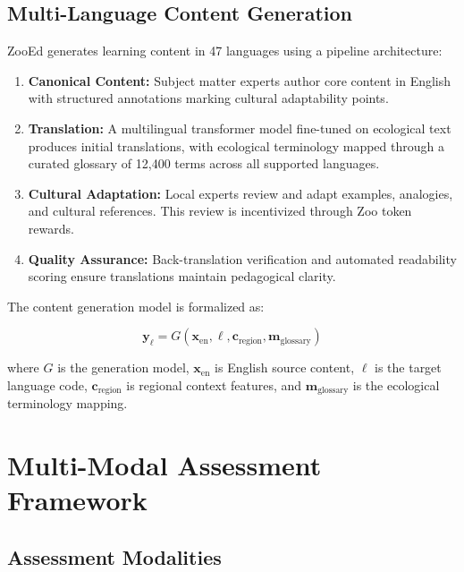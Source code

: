 \documentclass[11pt,a4paper]{article}
\begin{document}
\subsection{Multi-Language Content Generation}

ZooEd generates learning content in 47 languages using a pipeline architecture:

\begin{enumerate}[leftmargin=*]
    \item \textbf{Canonical Content:} Subject matter experts author core content in English with structured annotations marking cultural adaptability points.
    \item \textbf{Translation:} A multilingual transformer model fine-tuned on ecological text produces initial translations, with ecological terminology mapped through a curated glossary of 12,400 terms across all supported languages.
    \item \textbf{Cultural Adaptation:} Local experts review and adapt examples, analogies, and cultural references. This review is incentivized through Zoo token rewards.
    \item \textbf{Quality Assurance:} Back-translation verification and automated readability scoring ensure translations maintain pedagogical clarity.
\end{enumerate}

The content generation model is formalized as:

\begin{equation}
    \mathbf{y}_{\ell} = G(\mathbf{x}_{\text{en}}, \ell, \mathbf{c}_{\text{region}}, \mathbf{m}_{\text{glossary}})
\end{equation}

\noindent where $G$ is the generation model, $\mathbf{x}_{\text{en}}$ is English source content, $\ell$ is the target language code, $\mathbf{c}_{\text{region}}$ is regional context features, and $\mathbf{m}_{\text{glossary}}$ is the ecological terminology mapping.

\section{Multi-Modal Assessment Framework}
\label{sec:assessment}

\subsection{Assessment Modalities}
\end{document}
